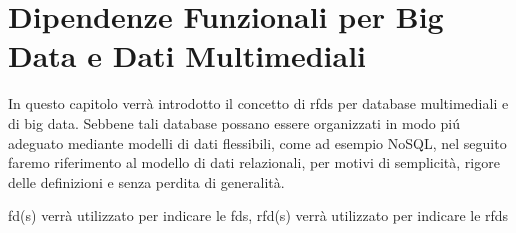\chapter{Dipendenze Funzionali per Big Data e Dati Multimediali}
\label{cap3:fd}
In questo capitolo verr\`{a} introdotto il concetto di \acrlong{rfds} per database multimediali e di big data. Sebbene tali database possano essere organizzati in modo pi\'{u} adeguato mediante modelli di dati flessibili, come ad esempio NoSQL, nel seguito faremo riferimento al modello di dati relazionali, per motivi di semplicit\`{a}, rigore delle definizioni e senza perdita di generalit\`{a}.\par
\acrshort{fd}(s) verr\`{a} utilizzato per indicare le \acrlong{fds}, \acrshort{rfd}(s) verr\`{a} utilizzato per indicare le \acrlong{rfds}

